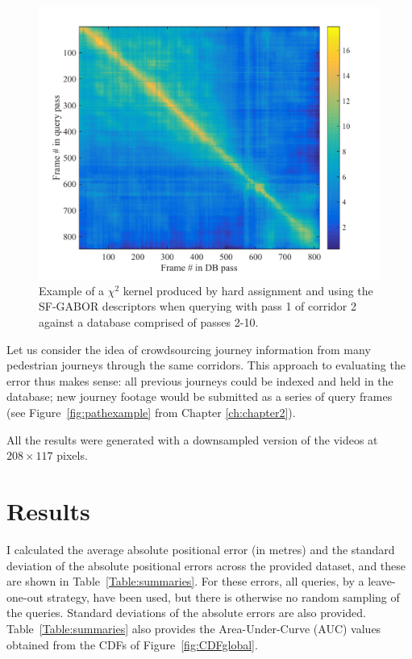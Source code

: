 \begin{figure}[h]
\centering
\includegraphics[width=\linewidth]{./gfx/Chapter04/kernel.pdf}
\caption{Example of a $\chi^2$ kernel produced by hard assignment and using the SF-GABOR descriptors when querying with pass 1 of corridor 2 against a database comprised of passes 2-10.}
\label{fig:kernel}
\end{figure}

Let us consider the idea of crowdsourcing journey information from many pedestrian journeys through the same corridors. This approach to evaluating the error thus makes sense:  all previous journeys could be indexed and held in the database; new journey footage would be submitted as a series of query frames (see Figure~\ref{fig:pathexample} from Chapter \ref{ch:chapter2}).    

All the results were generated with a downsampled version of the videos at $208 \times 117$ pixels. 




\section{Results}
\label{sec:ch4results}

I calculated the average absolute positional error (in metres) and the standard deviation of the absolute positional errors across the provided dataset, and these are shown in Table~\ref{Table:summaries}. For these errors, all queries, by a leave-one-out strategy, have been used, but there is otherwise no random sampling of the queries.  Standard deviations of the absolute errors are also provided.  Table~\ref{Table:summaries} also provides the Area-Under-Curve (AUC) values obtained from the CDFs of Figure~\ref{fig:CDFglobal}.


